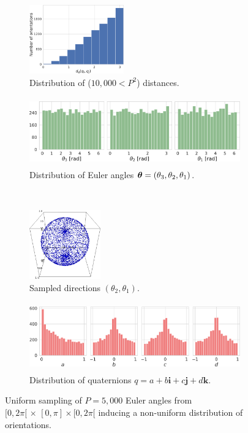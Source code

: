 \begin{figure}[ht!]
    \centering
    \begin{subfigure}[b]{0.36\linewidth}
        \centering
        \includegraphics[height=8em]{figures/dQ_5j0n_uniform_angles.pdf}
        \caption{Distribution of ($10,000<P^2$) distances.}
    \end{subfigure}
    \hfill
    \begin{subfigure}[b]{0.62\linewidth}
        \centering
        \includegraphics[height=8em]{figures/uniform_angles_ang.pdf}
        \caption{Distribution of Euler angles ${\boldsymbol{\theta}} = (\theta_3,\theta_2,\theta_1)$.}
    \end{subfigure}
    \\ \vspace{1em}
    \begin{subfigure}[b]{0.30\linewidth}
        \centering
        \includegraphics[height=8em]{figures/uniform_angles.png}
        \caption{Sampled directions $(\theta_2, \theta_1)$.}
    \end{subfigure}
    \hfill
    \begin{subfigure}[b]{0.66\linewidth}
        \centering
        \includegraphics[height=8em]{figures/uniform_angles_q.pdf}
        \caption{Distribution of quaternions $q = a + b\boldsymbol{i} + c\boldsymbol{j} + d\boldsymbol{k}$.}
    \end{subfigure}
     \caption{%
        Uniform sampling of $P=5,000$ Euler angles from $[0,2\pi[ \, \times \, [0,\pi] \times [0,2\pi[$ inducing a non-uniform distribution of orientations.
        }\label{fig:uniform-angles}
\end{figure}

